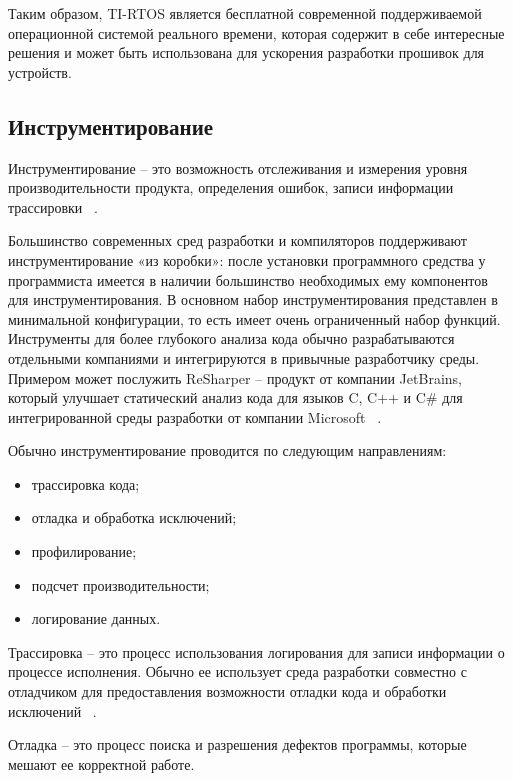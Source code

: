 Таким образом, TI-RTOS является бесплатной современной поддерживаемой
операционной системой реального времени, которая содержит в себе интересные решения
и может быть использована для ускорения разработки прошивок для устройств.


\subsection{Инструментирование}

Инструментирование -- это возможность отслеживания и измерения уровня
производительности продукта, определения ошибок, записи информации
трассировки ~\cite{instrumentation_site}.

Большинство современных сред разработки и компиляторов поддерживают
инструментирование «из коробки»: после установки программного средства
у программиста имеется в наличии большинство необходимых ему компонентов
для инструментирования. В основном набор инструментирования представлен в
минимальной конфигурации, то есть имеет очень ограниченный набор функций.
Инструменты для более глубокого анализа кода обычно разрабатываются отдельными
компаниями и интегрируются в привычные разработчику среды. Примером может
послужить ReSharper -- продукт от компании JetBrains, который улучшает
статический анализ кода для языков C, C++ и C\# для интегрированной среды
разработки от компании Microsoft ~\cite{resharper_site}.

Обычно инструментирование проводится по следующим направлениям:
\begin{itemize}
    \item трассировка кода;
    \item отладка и обработка исключений;
    \item профилирование;
    \item подсчет производительности;
    \item логирование данных.
\end{itemize}

Трассировка -- это процесс использования логирования для записи информации
о процессе исполнения. Обычно ее использует среда разработки совместно
с отладчиком для предоставления возможности отладки кода и обработки
исключений ~\cite{tracing_site}.

Отладка -- это процесс поиска и разрешения дефектов программы, которые
мешают ее корректной работе.

